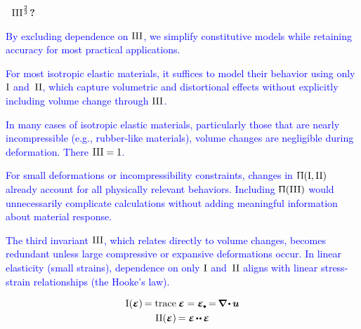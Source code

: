{\small
\setlength{\parindent}{0pt}

\begin{leftverticalbar}%
\textbf{
~${\mathrm{III}^{\frac{2}{3}}}$?}

\textcolor{blue}{By excluding dependence on $\mathrm{III}$, we simplify constitutive models
while retaining accuracy for most practical applications.
}

\textcolor{blue}{For most isotropic elastic materials,
it suffices to model their behavior using only ${\mathrm{I}}$ and~${\mathrm{II}}$,
which capture volumetric and distortional effects without explicitly including volume change through ${\mathrm{III}}$.
}

\textcolor{blue}{In many cases of isotropic elastic materials,
particularly those that are nearly incompressible
(e.g., rubber-like materials),
volume changes are negligible during deformation.
There ${\mathrm{III} = 1}$.
}

\textcolor{blue}{For small deformations or incompressibility constraints,
changes in ${\Uppi(\mathrm{I}, \mathrm{II})}$
already account for all physically relevant behaviors.
Including ${\Uppi(\mathrm{III})}$
would unnecessarily complicate calculations
without adding meaningful information about material response.
}

\textcolor{blue}{The third invariant $\mathrm{III}$,
which relates directly to volume changes,
becomes redundant unless large compressive or expansive deformations occur.
In linear elasticity (small strains),
dependence on only $\mathrm{I}$ and~$\mathrm{II}$
aligns with linear stress-strain relationships (the Hooke’s law).
}
\end{leftverticalbar}
\par}

\nopagebreak\vspace{-0.2em}
\begin{gather*}
\anyfirstinvariant(\infinitesimaldeformation) \hspace{-0.2ex}
= \trace{\infinitesimaldeformation}
= \infinitesimaldeformation\tracedot
= \hspace{-0.2ex} \boldnabla \hspace{-0.2ex} \dotp \hspace{-0.1ex} \fieldofdisplacements
\\
%
\anysecondinvariant(\infinitesimaldeformation) \hspace{-0.2ex}
= \infinitesimaldeformation \hspace{-0.2ex} \dotdotp \hspace{-0.1ex} \infinitesimaldeformation
\end{gather*}

